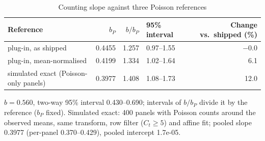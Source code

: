 \begin{table}[!tbp]
\centering
\scriptsize\renewcommand{\arraystretch}{1.15}
\setlength{\tabcolsep}{3pt}
\caption{Counting slope against three Poisson references}
\label{tab:r2-poisson}
\begin{tabularx}{\linewidth}{@{}Xrrlr@{}}
\toprule
Reference & $b_P$ & $b/b_P$ & 95\% interval & Change vs.\ shipped (\%) \\
\midrule
plug-in, as shipped & 0.4455 & 1.257 & 0.97--1.55 & $-$0.0 \\
plug-in, mean-normalised & 0.4199 & 1.334 & 1.02--1.64 & 6.1 \\
simulated exact (Poisson-only panels) & 0.3977 & 1.408 & 1.08--1.73 & 12.0 \\
\bottomrule
\end{tabularx}
\par\smallskip\parbox{\linewidth}{\scriptsize\linespread{1.15}\selectfont $\hat b=0.560$, two-way 95\% interval 0.430--0.690; intervals of $b/b_P$ divide it by the reference ($b_P$ fixed). Simulated exact: 400 panels with Poisson counts around the observed means, same transform, row filter ($C_t\ge 5$) and affine fit; pooled slope 0.3977 (per-panel 0.370--0.429), pooled intercept 1.7e-05.}
\end{table}

